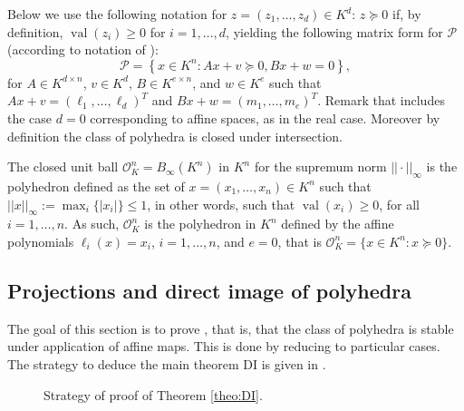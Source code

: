 \documentclass{elsarticle}
\theoremstyle{plain}
\theoremstyle{definition}
\newcommand{\PP}{\mathcal{P}}
\DeclareMathOperator{\val}{val}
\newcommand{\OK}{\mathcal{O}_K}
\begin{document}
Below we use the following notation for $z = (z_1,\ldots,z_d) \in K^d$:
$z \succeq 0$ if, by definition, $\val(z_i)\geq 0$ for $i=1,\ldots,d$,
yielding the following matrix form for $\PP$ (according to notation of
):
\begin{equation}\label{eq_def_polyhedra_compact}
  \PP = \left\lbrace x \in K^n : Ax+v \succeq 0, Bx+w = 0 \right\rbrace,
\end{equation}
for $A \in K^{d \times n}$, $v \in K^d$, $B \in K^{e \times n}$, and
$w \in K^e$ such that $Ax+v = (\ell_1,\ldots,\ell_d)^T$
and $Bx+w = (m_1,\ldots,m_e)^T$.
Remark that  includes the case $d=0$ corresponding to affine spaces, as in the real case.
Moreover by definition the class of polyhedra is closed under intersection.

\begin{example}
  The {closed unit ball} $\OK^n=B_\infty(K^n)$ in $K^n$ for the supremum norm $||\cdot||_{\infty}$ is the
  polyhedron defined as the set of $x=(x_1,\ldots,x_n) \in K^n$ such that $||x||_{\infty} :=
  \max_i\{\vert x_i \vert\} \leq 1$, in other words, such that $\val(x_i) \geq 0$, for all $i=1, \ldots, n$.
  As such, $\OK^n$ is the polyhedron in $K^n$ defined by the affine polynomials
  $\ell_i(x)=x_i$, $i=1,\ldots, n$, and $e=0$, that is $\OK^n = \{x \in K^n : x \succeq 0\}$.
\end{example}

\subsection{Projections and direct image of polyhedra}
\label{ssec:projections}
The goal of this section is to prove , that is, that
the class of polyhedra is stable under application of affine maps. This is done
by reducing to particular cases. The strategy to deduce the main theorem DI 
is given in .

\begin{figure}[!ht] 
\centering
{}
\caption{Strategy of proof of Theorem \ref{theo:DI}.}
\label{fig:di-properties}
\end{figure}
\end{document}
